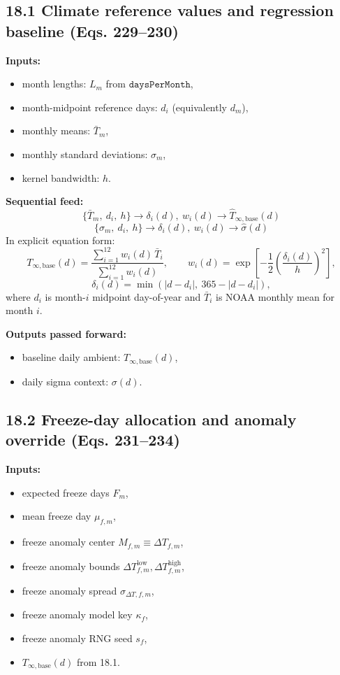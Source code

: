 \documentclass[11pt]{article}
\begin{document}
\subsection*{18.1 Climate reference values and regression baseline (Eqs. 229--230)}
\textbf{Inputs:}
\begin{itemize}[leftmargin=*]
\item month lengths: \(L_m\) from \(\texttt{daysPerMonth}\),
\item month-midpoint reference days: \(d_i\) (equivalently \(d_m\)),
\item monthly means: \(\bar T_m\),
\item monthly standard deviations: \(\sigma_m\),
\item kernel bandwidth: \(h\).
\end{itemize}

\textbf{Sequential feed:}
\[
\{\bar T_m,\ d_i,\ h\}
\rightarrow
\delta_i(d),\ w_i(d)
\rightarrow
\hat T_{\infty,\mathrm{base}}(d)
\]
\[
\{\sigma_m,\ d_i,\ h\}
\rightarrow
\delta_i(d),\ w_i(d)
\rightarrow
\hat\sigma(d)
\]
In explicit equation form:
\[
T_{\infty,\mathrm{base}}(d)=\frac{\sum_{i=1}^{12} w_i(d)\,\bar T_i}{\sum_{i=1}^{12} w_i(d)},
\qquad
w_i(d)=\exp\!\left[-\frac{1}{2}\left(\frac{\delta_i(d)}{h}\right)^2\right],
\]
\[
\delta_i(d)=\min\!\left(|d-d_i|,\ 365-|d-d_i|\right),
\]
where \(d_i\) is month-\(i\) midpoint day-of-year and \(\bar T_i\) is NOAA monthly mean for month \(i\).

\textbf{Outputs passed forward:}
\begin{itemize}[leftmargin=*]
\item baseline daily ambient: \(T_{\infty,\mathrm{base}}(d)\),
\item daily sigma context: \(\sigma(d)\).
\end{itemize}

\subsection*{18.2 Freeze-day allocation and anomaly override (Eqs. 231--234)}
\textbf{Inputs:}
\begin{itemize}[leftmargin=*]
\item expected freeze days \(F_m\),
\item mean freeze day \(\mu_{f,m}\),
\item freeze anomaly center \(M_{f,m}\equiv\Delta T_{f,m}\),
\item freeze anomaly bounds \(\Delta T_{f,m}^{\mathrm{low}},\Delta T_{f,m}^{\mathrm{high}}\),
\item freeze anomaly spread \(\sigma_{\Delta T,f,m}\),
\item freeze anomaly model key \(\kappa_f\),
\item freeze anomaly RNG seed \(s_f\),
\item \(T_{\infty,\mathrm{base}}(d)\) from 18.1.
\end{itemize}
\end{document}
